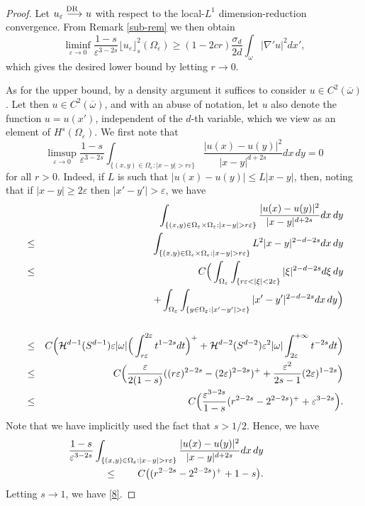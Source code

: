 \documentclass[11pt]{article}
\def\e{\varepsilon}
\begin{document}
\begin{proof} Let $u_\e\buildrel{\hbox {\rm\scriptsize DR }\, \, }\over{\longrightarrow} u$ with respect to the local-$L^1$ dimension-reduction convergence. From Remark \ref{sub-rem} we then obtain 
$$
\liminf_{\e\to 0}\frac{1-s}{\e^{3-2s}}\lfloor u_\e\rfloor_s^2(\Omega_\e)
\ge (1-2cr)\frac{\sigma_{d}}{2d}\int_{\omega}|\nabla' u|^2dx',
$$
which gives the desired lower bound by letting $r\to0$.

As for the upper bound, by a  density argument it suffices to consider $u\in C^2(\overline\omega)$.
Let then $u\in C^2(\overline\omega)$, and with an abuse of notation, let $u$ also denote the function $u=u(x')$, independent of the $d$-th variable, which we view as an element of  $H^s(\Omega_\e)$. 
We first note that 
\begin{equation}\label{8}
\limsup_{\e\to 0} \frac{1-s}{\e^{3-2s}} \int_{\{(x,y)\in\Omega_\e: |x-y|>r\e\}}\frac{|u(x)-u(y)|^2}{|x-y|^{d+2s}} dx\,dy=0
\end{equation}
for all $r>0$.
Indeed, if $L$ is such that $|u(x)-u(y)|\le L|x-y|$, then,
noting that if $|x-y|\ge 2\e$ then $|x'-y'|>\e$, we have
\begin{eqnarray*}&&
\hskip-1.5cm\int_{\{(x,y)\in\Omega_\e\times\Omega_\e: |x-y|>r\e\}}\frac{|u(x)-u(y)|^2}{|x-y|^{d+2s}} dx\,dy\\
&\le& \int_{\{(x,y)\in\Omega_\e\times\Omega_\e: |x-y|>r\e\}}L^2|x-y|^{2-d-2s} dx\,dy\\
&\le& C\Big(\int_{\Omega_\e} \int_{\{r\e<|\xi|<2\e\}}|\xi|^{2-d-2s} d\xi\,dy\\
&&+
\int_{\Omega_\e}\int_{\{y\in\Omega_\e: |x'-y'|>\e\}}|x'-y'|^{2-d-2s} dx\,dy\Big)\\\\
&\le& C\Big( \mathcal H^{d-1}(S^{d-1})\e|\omega|\Big( \int_{r\e}^{2\e}t^{1-2s} dt\Big)^+ +
\mathcal H^{d-2}(S^{d-2})\e^2 |\omega| \int_{2\e}^{+\infty}t^{-2s}dt\Big)
\\
&\le& C\Big(\frac{\e}{2(1-s)}((r\e)^{2-2s}-(2\e)^{2-2s})^++\frac{\e^2}{2s-1}(2\e)^{1-2s}\Big)\\
&\le& C\Big( \frac{\e^{3-2s}}{1-s}(r^{2-2s}-2^{2-2s})^++ \e^{3-2s}\Big).
\end{eqnarray*}
Note that we have implicitly used the fact that $s>1/2$.
Hence, we have
\begin{eqnarray}\label{a1}\nonumber
&&\hskip-2cm\frac{1-s}{\e^{3-2s}} \int_{\{(x,y)\in\Omega_\e: |x-y|>r\e\}}\frac{|u(x)-u(y)|^2}{|x-y|^{d+2s}} dx\,dy\\
&\le& C\big((r^{2-2s}-2^{2-2s})^++ 1-s\big).
\end{eqnarray}
Letting $s\to 1$, we have \eqref{8}.


\end{proof}
\end{document}
